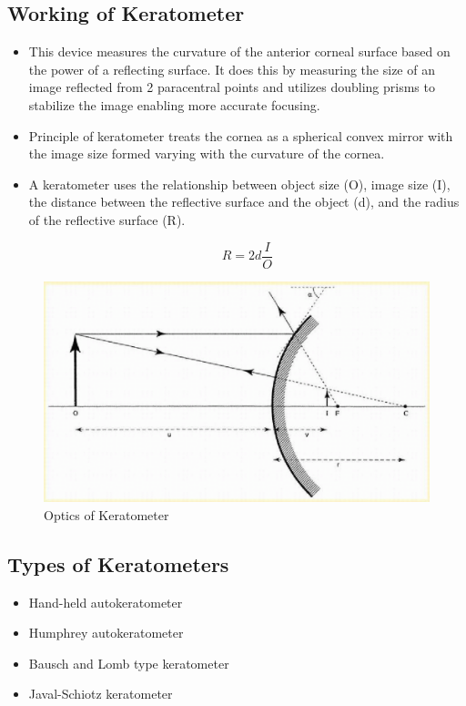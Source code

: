 \documentclass{article}
\begin{document}
\subsection{Working of Keratometer}
\begin{itemize}
\item This device measures the curvature of the anterior corneal surface based on the power of a reflecting surface. It does this by measuring the size of an image reflected from 2 paracentral points and utilizes doubling prisms to stabilize the image enabling more accurate focusing.
\item Principle of keratometer treats the	cornea as a	spherical convex mirror with the image size formed varying with the curvature of the cornea.
\item A keratometer uses the relationship between object size (O), image size (I), the distance between the reflective surface and the object (d), and the radius of the reflective surface (R).

                   $$R=2d\frac{I}{O}$$
\end{itemize}
\begin{figure} [h]
    \centering
    \includegraphics[scale=0.35]{ezgif.com-gif-maker (3).jpg}
    \caption{Optics of Keratometer}
    \label{fig:optics of keratometer}
\end{figure}
\subsection{Types of Keratometers}
\begin{itemize}
\item Hand-held autokeratometer
\item Humphrey autokeratometer
\item Bausch and Lomb	type keratometer
\item Javal-Schiotz keratometer	
\end{itemize}
\end{document}

